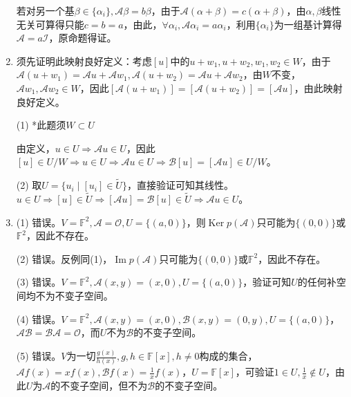 \documentclass[a4paper,UTF8,fontset=windows]{ctexart}
\DeclareMathOperator{\im}{Im}
\DeclareMathOperator{\Ker}{Ker}
\begin{document}
\begin{enumerate}
若对另一个基$\beta\in\{\alpha_i\},\mathcal{A}\beta=b\beta$，由于$\mathcal{A}(\alpha+\beta)=c(\alpha+\beta)$，由$\alpha,\beta$线性无关可算得只能$c=b=a$，由此，$\forall\alpha_i,\mathcal{A}\alpha_i=a\alpha_i$，利用$\{\alpha_i\}$为一组基计算得$\mathcal{A}=a\mathcal{I}$，原命题得证。

\item
须先证明此映射良好定义：考虑$[u]$中的$u+w_1,u+w_2,w_1,w_2\in W$，由于$\mathcal{A}(u+w_1)=\mathcal{A}u+\mathcal{A}w_1,\mathcal{A}(u+w_2)=\mathcal{A}u+\mathcal{A}w_2$，由$W$不变，$\mathcal{A}w_1,\mathcal{A}w_2\in W$，因此$[\mathcal{A}(u+w_1)]=[\mathcal{A}(u+w_2)]=[\mathcal{A}u]$，由此映射良好定义。

(1) *此题须$W\subset U$

由定义，$u\in U\Rightarrow\mathcal{A}u\in U$，因此$[u]\in U/W\Rightarrow u\in U\Rightarrow\mathcal{A}u\in U\Rightarrow\mathcal{B}[u]=[\mathcal{A}u]\in U/W$。

(2) 取$U=\{u_i\mid[u_i]\in\tilde{U}\}$，直接验证可知其线性。$u\in U\Rightarrow [u]\in\tilde{U}\Rightarrow[\mathcal{A}u]=\mathcal{B}[u]\in\tilde{U}\Rightarrow\mathcal{A}u\in U$。

\item
(1) 错误。$V=\mathbb{F}^2,\mathcal{A}=\mathcal{O},U=\{(a,0)\}$，则$\Ker p(\mathcal{A})$只可能为$\{(0,0)\}$或$\mathbb{F}^2$，因此不存在。

(2) 错误。反例同(1)，$\im p(\mathcal{A})$只可能为$\{(0,0)\}$或$\mathbb{F}^2$，因此不存在。

(3) 错误。$V=\mathbb{F}^2,\mathcal{A}(x,y)=(x,0),U=\{(a,0)\}$，验证可知$U$的任何补空间均不为不变子空间。

(4) 错误。$V=\mathbb{F}^2,\mathcal{A}(x,y)=(x,0),\mathcal{B}(x,y)=(0,y),U=\{(a,0)\}$，$\mathcal{A}\mathcal{B}=\mathcal{B}\mathcal{A}=\mathcal{O}$，而$U$不为$\mathcal{B}$的不变子空间。

(5) 错误。$V$为一切$\frac{g(x)}{h(x)},g,h\in\mathbb{F}[x],h\ne0$构成的集合，$\mathcal{A}f(x)=xf(x),\mathcal{B}f(x)=\frac{1}{x}f(x)$，$U=\mathbb{F}[x]$，可验证$1\in U,\frac{1}{x}\notin U$，由此$U$为$\mathcal{A}$的不变子空间，但不为$\mathcal{B}$的不变子空间。
\end{enumerate}
\end{document}
